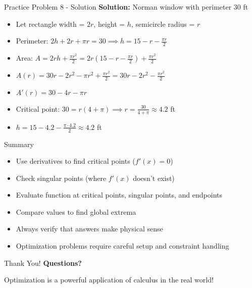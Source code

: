 \documentclass[aspectratio=169]{beamer}
\begin{document}
\begin{frame}{Practice Problem 8 - Solution}
\textbf{Solution:} Norman window with perimeter 30 ft

\begin{itemize}
    \item Let rectangle width = $2r$, height = $h$, semicircle radius = $r$
    \item Perimeter: $2h + 2r + \pi r = 30 \implies h = 15 - r - \frac{\pi r}{2}$
    \item Area: $A = 2rh + \frac{\pi r^2}{2} = 2r(15 - r - \frac{\pi r}{2}) + \frac{\pi r^2}{2}$
    \item $A(r) = 30r - 2r^2 - \pi r^2 + \frac{\pi r^2}{2} = 30r - 2r^2 - \frac{\pi r^2}{2}$
    \item $A'(r) = 30 - 4r - \pi r$
    \item Critical point: $30 = r(4 + \pi) \implies r = \frac{30}{4 + \pi} \approx 4.2$ ft
    \item $h = 15 - 4.2 - \frac{\pi \cdot 4.2}{2} \approx 4.2$ ft
\end{itemize}
\end{frame}

\begin{frame}{Summary}
\begin{itemize}
    \item Use derivatives to find critical points ($f'(x) = 0$)
    \item Check singular points (where $f'(x)$ doesn't exist)
    \item Evaluate function at critical points, singular points, and endpoints
    \item Compare values to find global extrema
    \item Always verify that answers make physical sense
    \item Optimization problems require careful setup and constraint handling
\end{itemize}
\end{frame}

\begin{frame}{Thank You!}
\centering
\vspace{2cm}
{\Huge \textcolor{myblue}{\textbf{Questions?}}}

\vspace{1cm}
{\Large Optimization is a powerful application of calculus in the real world!}
\end{frame}
\end{document}
